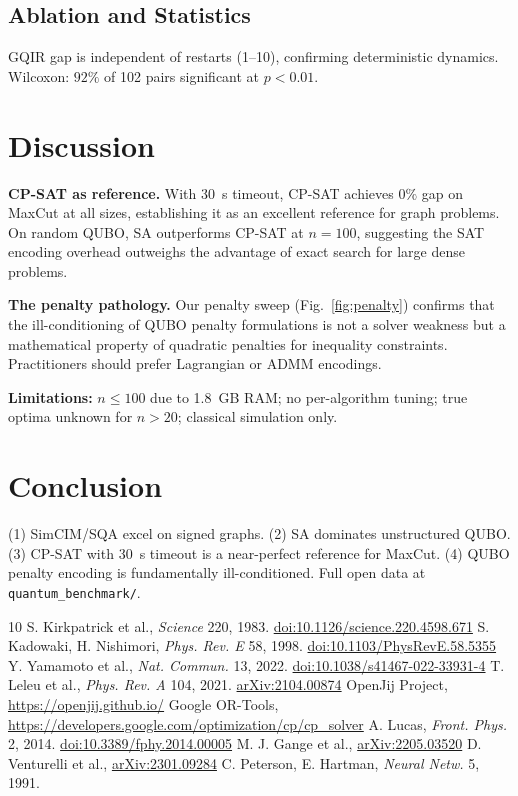 \documentclass[10pt,twocolumn]{article}
\begin{document}
\subsection{Ablation and Statistics}
GQIR gap is independent of restarts (1--10), confirming deterministic dynamics. Wilcoxon: $92\%$ of 102 pairs significant at $p<0.01$.

\section{Discussion}

\textbf{CP-SAT as reference.} With 30~s timeout, CP-SAT achieves $0\%$ gap on MaxCut at all sizes, establishing it as an excellent reference for graph problems. On random QUBO, SA outperforms CP-SAT at $n=100$, suggesting the SAT encoding overhead outweighs the advantage of exact search for large dense problems.

\textbf{The penalty pathology.} Our penalty sweep (Fig.~\ref{fig:penalty}) confirms that the ill-conditioning of QUBO penalty formulations is not a solver weakness but a mathematical property of quadratic penalties for inequality constraints. Practitioners should prefer Lagrangian or ADMM encodings.

\textbf{Limitations:} $n\leq100$ due to 1.8~GB RAM; no per-algorithm tuning; true optima unknown for $n>20$; classical simulation only.

\section{Conclusion}
(1) SimCIM/SQA excel on signed graphs. (2) SA dominates unstructured QUBO. (3) CP-SAT with 30~s timeout is a near-perfect reference for MaxCut. (4) QUBO penalty encoding is fundamentally ill-conditioned. Full open data at \texttt{quantum\_benchmark/}.


\begin{thebibliography}{10}
 S. Kirkpatrick et al., \emph{Science} 220, 1983. \href{https://doi.org/10.1126/science.220.4598.671}{doi:10.1126/science.220.4598.671}
 S. Kadowaki, H. Nishimori, \emph{Phys. Rev. E} 58, 1998. \href{https://doi.org/10.1103/PhysRevE.58.5355}{doi:10.1103/PhysRevE.58.5355}
 Y. Yamamoto et al., \emph{Nat. Commun.} 13, 2022. \href{https://doi.org/10.1038/s41467-022-33931-4}{doi:10.1038/s41467-022-33931-4}
 T. Leleu et al., \emph{Phys. Rev. A} 104, 2021. \href{https://arxiv.org/abs/2104.00874}{arXiv:2104.00874}
 OpenJij Project, \url{https://openjij.github.io/}
 Google OR-Tools, \url{https://developers.google.com/optimization/cp/cp_solver}
 A. Lucas, \emph{Front. Phys.} 2, 2014. \href{https://doi.org/10.3389/fphy.2014.00005}{doi:10.3389/fphy.2014.00005}
 M. J. Gange et al., \href{https://arxiv.org/abs/2205.03520}{arXiv:2205.03520}
 D. Venturelli et al., \href{https://arxiv.org/abs/2301.09284}{arXiv:2301.09284}
 C. Peterson, E. Hartman, \emph{Neural Netw.} 5, 1991.
\end{thebibliography}
\end{document}
